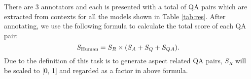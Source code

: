 There are 3 annotators and each is presented with a total of  QA pairs which are extracted from  contexts for all the models shown in Table \ref{tab:res}.
After annotating, we use the following formula to calculate the total score of each QA pair:
\begin{equation*}
\small
S_{\text{Human}} = S_R \times (S_A + S_Q + S_{QA}).
\end{equation*}
Due to the definition of this task is to generate aspect related QA pairs, $S_R$ will be scaled to [0, 1] and regarded as a factor in above formula.



